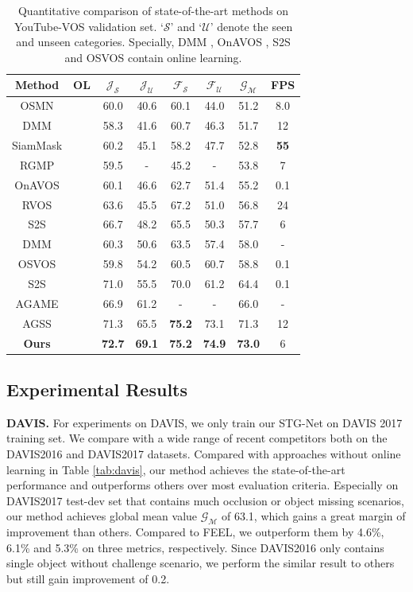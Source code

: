 \documentclass[letterpaper]{article} %
\newcommand{\cmark}{\ding{52}}%
\newcommand{\xmark}{\ding{56}}%
\begin{document}
\begin{table}[t!]
\small
\centering
\begin{tabular}{c|c|cccc|c|c}
\hline
Method & OL & $\mathcal{J}_\mathcal{S}$ & $\mathcal{J}_\mathcal{U}$ & $\mathcal{F}_\mathcal{S}$ & $\mathcal{F}_\mathcal{U}$ & $\mathcal{G}_\mathcal{M}$ & FPS \\ \hline
OSMN & \xmark & 60.0 & 40.6 & 60.1 & 44.0 & 51.2 & 8.0 \\
DMM & \xmark & 58.3 & 41.6 & 60.7 & 46.3 & 51.7 & 12 \\
SiamMask & \xmark & 60.2 & 45.1 & 58.2 & 47.7 & 52.8 & \textbf{55} \\
RGMP & \xmark & 59.5 & - & 45.2 & - & 53.8 & 7 \\
OnAVOS  & \cmark & 60.1 & 46.6 & 62.7 & 51.4 & 55.2 & 0.1 \\
RVOS & \xmark & 63.6 & 45.5 & 67.2 & 51.0 & 56.8 & 24 \\
S2S & \xmark & 66.7 & 48.2 & 65.5 & 50.3 & 57.7 & 6 \\
DMM & \cmark & 60.3 & 50.6 & 63.5 & 57.4 & 58.0 & - \\
OSVOS & \cmark & 59.8 & 54.2 & 60.5 & 60.7 & 58.8 & 0.1 \\
S2S & \cmark & 71.0 & 55.5 & 70.0 & 61.2 & 64.4 & 0.1 \\
AGAME & \xmark & 66.9 & 61.2 & - & - & 66.0 & - \\
AGSS & \xmark & 71.3 & 65.5 & \textbf{75.2} & 73.1 & 71.3 & 12 \\ \hline
\textbf{Ours} & \xmark & \textbf{72.7} & \textbf{69.1} & \textbf{75.2} & \textbf{74.9} & \textbf{73.0} & 6\\ \hline
\end{tabular}
\caption{Quantitative comparison of state-of-the-art methods on YouTube-VOS validation set. `$\mathcal{S}$' and `$\mathcal{U}$' denote the seen and unseen categories. Specially, DMM \cite{zeng2019dmm}, OnAVOS \cite{voigtlaender2017online}, S2S \cite{xu2018youtube} and OSVOS \cite{caelles2017one} contain online learning.}
\label{tab:youtubevos}
\end{table}

\subsection{Experimental Results}

\textbf{DAVIS.}
For experiments on DAVIS, we only train our STG-Net on DAVIS 2017 training set. We compare with a wide range of recent competitors both on the DAVIS2016 and DAVIS2017 datasets. Compared with approaches without online learning in Table \ref{tab:davis}, our method achieves the state-of-the-art performance and outperforms others over most evaluation criteria. Especially on DAVIS2017 test-dev set that contains much occlusion or object missing scenarios, our method achieves global mean value $\mathcal{G}_\mathcal{M}$ of 63.1, which gains a great margin of improvement than others. Compared to FEEL, we outperform them by 4.6\%, 6.1\% and 5.3\% on three metrics, respectively. Since DAVIS2016 only contains single object without challenge scenario, we perform the similar result to others but still gain improvement of 0.2.
\end{document}
